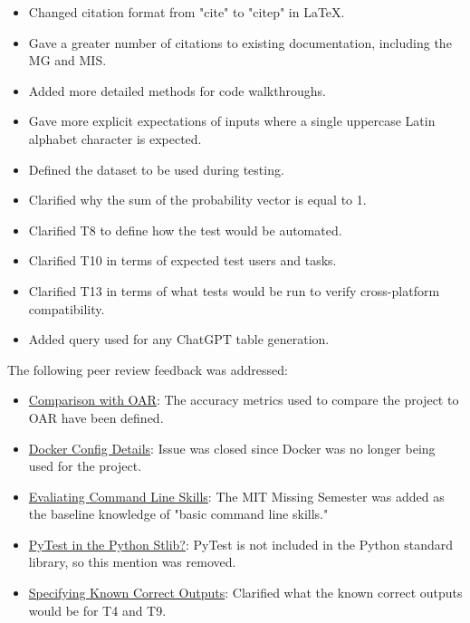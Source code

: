 \documentclass{article}
\begin{document}
\begin{itemize}
  \item Changed citation format from "cite" to "citep" in LaTeX.
  \item Gave a greater number of citations to existing documentation, including the MG and MIS.
  \item Added more detailed methods for code walkthroughs.
  \item Gave more explicit expectations of inputs where a single uppercase Latin alphabet character is expected.
  \item Defined the dataset to be used during testing.
  \item Clarified why the sum of the probability vector is equal to 1.
  \item Clarified T8 to define how the test would be automated.
  \item Clarified T10 in terms of expected test users and tasks.
  \item Clarified T13 in terms of what tests would be run to verify cross-platform compatibility.
  \item Added query used for any ChatGPT table generation.
\end{itemize}

\noindent The following peer review feedback was addressed:

\begin{itemize}
  \item \href{https://github.com/ptrandev/OCRacle/issues/16}{Comparison with OAR}:
  The accuracy metrics used to compare the \progname{} project to OAR have been defined.
  \item \href{https://github.com/ptrandev/OCRacle/issues/15}{Docker Config Details}:
  Issue was closed since Docker was no longer being used for the project.
  \item \href{https://github.com/ptrandev/OCRacle/issues/14}{Evaliating Command Line Skills}:
  The MIT Missing Semester was added as the baseline knowledge of "basic command line skills."
  \item \href{https://github.com/ptrandev/OCRacle/issues/13}{PyTest in the Python Stlib?}:
  PyTest is not included in the Python standard library, so this mention was removed.
  \item \href{https://github.com/ptrandev/OCRacle/issues/12}{Specifying Known Correct Outputs}:
  Clarified what the known correct outputs would be for T4 and T9.
\end{itemize}
\end{document}

